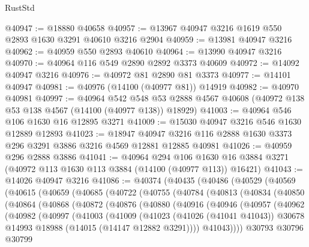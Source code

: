 \begin{lexlean}{RustStd}
\begin{coremodule}
@40947 := @18880 @40658
@40957 := @13967 @40947 @3216 @1619 @550 @2893 @1630 @3291 @40610 @3216 @2904
@40959 := @13981 @40947 @3216
@40962 := @40959 @550 @2893 @40610
@40964 := @13990 @40947 @3216
@40970 := @40964 @116 @549 @2890 @2892 @3373 @40609
@40972 := @14092 @40947 @3216
@40976 := @40972 @81 @2890 @81 @3373
@40977 := @14101 @40947
@40981 := @40976 (@14100 (@40977 @81)) @14919
@40982 := @40970 @40981
@40997 := @40964
    @542
    @548
    @53
    @2888
    @4567
    @40608
    (@40972 @138 @53 @138 @4567 (@14100 (@40977 @138)) @18929)
@41003 := @40964 @546 @106 @1630 @16 @12895 @3271
@41009 := @15030 @40947 @3216 @546 @1630 @12889 @12893
@41023 := @18947
    @40947
    @3216
    @116
    @2888
    @1630
    @3373
    @296
    @3291
    @3886
    @3216
    @4569
    @12881
    @12885
    @40981
@41026 := @40959 @296 @2888 @3886
@41041 := @40964
    @294
    @106
    @1630
    @16
    @3884
    @3271
    (@40972 @113 @1630 @113 @3884 (@14100 (@40977 @113)) @16421)
@41043 := @14026 @40947 @3216
@41086 := @40374
    (@40435
      (@40486
        (@40529
          (@40569
            (@40615
              (@40659
                (@40685
                  (@40722
                    (@40755
                      (@40784
                        (@40813
                          (@40834
                            (@40850
                              (@40864
                                (@40868
                                  (@40872
                                    (@40876
                                      (@40880
                                        (@40916
                                          (@40946
                                            (@40957
                                              (@40962
                                                (@40982
                                                  (@40997
                                                    (@41003
                                                      (@41009
                                                        (@41023
                                                          (@41026 (@41041 @41043))
                                                          @30678
                                                          @14993
                                                          @18988
                                                          (@14015 (@14147 @12882 @3291))))
                                                      @41043))))
                                              @30793
                                              @30796
                                              @30799

\end{coremodule}
\end{lexlean}
